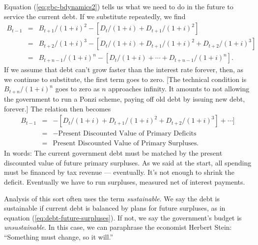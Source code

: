 Equation (\ref{eq:gbc-bdynamics2}) tells us what we need to do in the future
to service the current debt.
If we substitute repeatedly, we find
\begin{eqnarray*}
    B_{t-1}   &=&  B_{t+1}/(1+i)^2 - [D_t/(1+i)+ D_{t+1}/(1+i)^2] \\
            &=&  B_{t+2}/(1+i)^3 -
                [D_t/(1+i)+ D_{t+1}/(1+i)^2 + D_{t+2}/(1+i)^3] \\
            &=&  B_{t+n-1}/(1+i)^n -
                [D_t/(1+i)+ \cdots + D_{t+n-1}/(1+i)^n] .
\end{eqnarray*}
If we assume that debt can't grow faster than the interest rate forever,
then, as we continue to substitute, the first term goes to zero.
[The technical condition is $B_{t+n}/(1+i)^n$ goes to zero as $n$
approaches infinity.
It amounts to not allowing the government to run a Ponzi scheme,
paying off old debt by issuing new debt, forever.]
The relation then becomes
\begin{eqnarray}
    B_{t-1}   &=&  -[D_t/(1+i)+ D_{t+1}/(1+i)^2 +
                   D_{t+2}/(1+i)^3] +   \cdots ]  \nonumber \\
            &=& - \mbox{Present Discounted Value of Primary Deficits}
                \phantom{\sum} \nonumber \\
            &=& \mbox{Present Discounted Value of Primary Surpluses} .
            \label{eq:debt-future-surpluses}
\end{eqnarray}
In words:   The current government debt must be matched
by the present discounted value of future primary surpluses.
As we said at the start, all spending must be financed by tax revenue --- eventually.
It's not enough to shrink the deficit.
Eventually we have to run surpluses, measured net of interest payments.

Analysis of this sort often uses the term {\it sustainable\/}.
We say the debt is sustainable if current debt is balanced
by plans for future surpluses, as in equation (\ref{eq:debt-future-surpluses}).
If not, we say the government's budget is {\it unsustainable\/}.
In this case, we can paraphrase the economist Herbert Stein:
``Something must change, so it will.''


\begin{comment}
Although (primary) government deficits must eventually be reversed,
they can affect the economy while they last.
One route is distribution.
If taxes are delayed long enough, the tax burden
will be shifted from current to future generations.
Thus the US contribution to World War II was financed largely with debt,
shifting some of the burden from those alive at the time to those born later.

Is deficit financing a good or bad thing?
One approach to this question is based on tax smoothing.
As we mentioned in ``Notes on taxes,''
the economic disincentives built into taxes are minimized
by having relatively constant tax rates even if tax revenues
vary over time.
On average this is likely to lead to governments running (modest)
surpluses in booms and deficits in recessions,
as tax revenues go up and down with the economy.
\end{comment}


